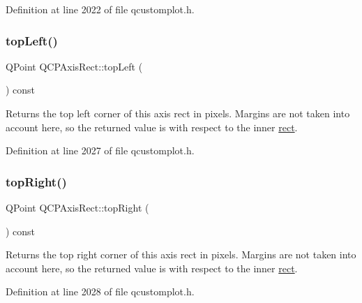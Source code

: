 Definition at line 2022 of file qcustomplot.\+h.

\mbox{\label{class_q_c_p_axis_rect_a5a847b3ddeca3abec38d3838fefb0dbd}} 
\subsubsection{\texorpdfstring{top\+Left()}{topLeft()}}
{\footnotesize\ttfamily Q\+Point Q\+C\+P\+Axis\+Rect\+::top\+Left (\begin{DoxyParamCaption}{ }\end{DoxyParamCaption}) const\hspace{0.3cm}{\ttfamily [inline]}}

Returns the top left corner of this axis rect in pixels. Margins are not taken into account here, so the returned value is with respect to the inner \hyperlink{class_q_c_p_layout_element_a208effccfe2cca4a0eaf9393e60f2dd4}{rect}. 

Definition at line 2027 of file qcustomplot.\+h.

\mbox{\label{class_q_c_p_axis_rect_a7aa221967549ba71b98c465bf8234758}} 
\subsubsection{\texorpdfstring{top\+Right()}{topRight()}}
{\footnotesize\ttfamily Q\+Point Q\+C\+P\+Axis\+Rect\+::top\+Right (\begin{DoxyParamCaption}{ }\end{DoxyParamCaption}) const\hspace{0.3cm}{\ttfamily [inline]}}

Returns the top right corner of this axis rect in pixels. Margins are not taken into account here, so the returned value is with respect to the inner \hyperlink{class_q_c_p_layout_element_a208effccfe2cca4a0eaf9393e60f2dd4}{rect}. 

Definition at line 2028 of file qcustomplot.\+h.

\mbox{\label{class_q_c_p_axis_rect_a255080a017df9083a60a321ef2ba9ed8}} 
